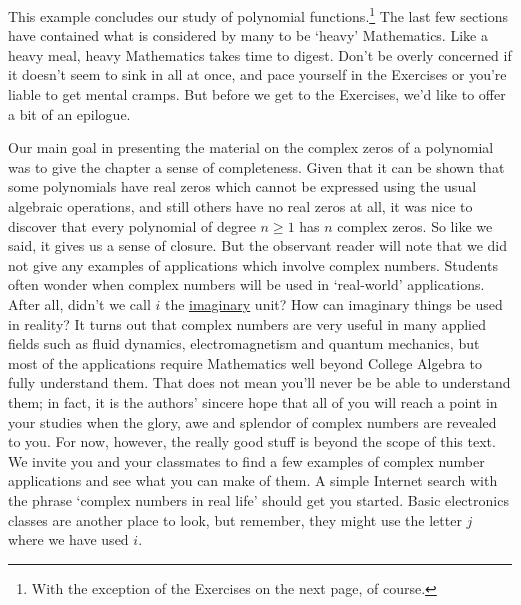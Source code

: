 This example concludes our study of polynomial functions.\footnote{With the exception of the Exercises on the next page, of course.}  The last few sections have contained what is considered by many to be `heavy' Mathematics.  Like a heavy meal, heavy Mathematics takes time to digest.  Don't be overly concerned if it doesn't seem to sink in all at once, and pace yourself in the Exercises or you're liable to get mental cramps.  But before we get to the Exercises, we'd like to offer a bit of an epilogue.  

\medskip

\label{complexepilogue}

Our main goal in presenting the material on the complex zeros of a polynomial was to give the chapter a sense of completeness.  Given that it can be shown that some polynomials have real zeros which cannot be expressed using the usual algebraic operations, and still others have no real zeros at all, it was nice to discover that every polynomial of degree $n \geq 1$ has $n$ complex zeros.  So like we said, it gives us a sense of closure.  But the observant reader will note that we did not give any examples of applications which involve complex numbers. Students often wonder when complex numbers will be used in `real-world' applications.  After all, didn't we call $i$ the \underline{imaginary} unit?  How can imaginary things be used in reality?  It turns out that complex numbers are very useful in many applied fields such as fluid dynamics, electromagnetism and quantum mechanics, but most of the applications require Mathematics well beyond College Algebra to fully understand them.  That does not mean you'll never be be able to understand them; in fact, it is the authors' sincere hope that all of you will reach a point in your studies when the glory, awe and splendor of complex numbers are revealed to you.  For now, however, the really good stuff is beyond the scope of this text. We invite you and your classmates to find a few examples of complex number applications and see what you can make of them.  A simple Internet search with the phrase `complex numbers in real life' should get you started.  Basic electronics classes are another place to look, but remember, they might use the letter $j$ where we have used $i$.

\medskip

